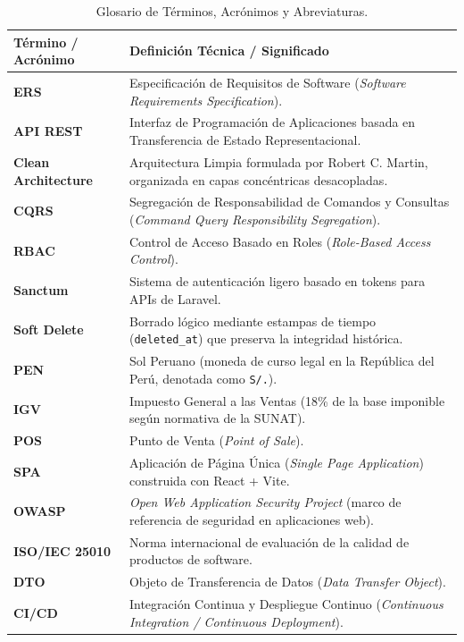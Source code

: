 \begin{table}[H]
\centering
\small
\begin{tabularx}{\linewidth}{l>{\raggedright\arraybackslash}X}
\toprule
\rowcolor{LightSlate}
\textbf{Término / Acrónimo} & \textbf{Definición Técnica / Significado} \\
\midrule
\textbf{ERS} & Especificación de Requisitos de Software (\textit{Software Requirements Specification}). \\
\textbf{API REST} & Interfaz de Programación de Aplicaciones basada en Transferencia de Estado Representacional. \\
\textbf{Clean Architecture} & Arquitectura Limpia formulada por Robert C. Martin, organizada en capas concéntricas desacopladas. \\
\textbf{CQRS} & Segregación de Responsabilidad de Comandos y Consultas (\textit{Command Query Responsibility Segregation}). \\
\textbf{RBAC} & Control de Acceso Basado en Roles (\textit{Role-Based Access Control}). \\
\textbf{Sanctum} & Sistema de autenticación ligero basado en tokens para APIs de Laravel. \\
\textbf{Soft Delete} & Borrado lógico mediante estampas de tiempo (\texttt{deleted\_at}) que preserva la integridad histórica. \\
\textbf{PEN} & Sol Peruano (moneda de curso legal en la República del Perú, denotada como \texttt{S/.}). \\
\textbf{IGV} & Impuesto General a las Ventas (18\% de la base imponible según normativa de la SUNAT). \\
\textbf{POS} & Punto de Venta (\textit{Point of Sale}). \\
\textbf{SPA} & Aplicación de Página Única (\textit{Single Page Application}) construida con React + Vite. \\
\textbf{OWASP} & \textit{Open Web Application Security Project} (marco de referencia de seguridad en aplicaciones web). \\
\textbf{ISO/IEC 25010} & Norma internacional de evaluación de la calidad de productos de software. \\
\textbf{DTO} & Objeto de Transferencia de Datos (\textit{Data Transfer Object}). \\
\textbf{CI/CD} & Integración Continua y Despliegue Continuo (\textit{Continuous Integration / Continuous Deployment}). \\
\bottomrule
\end{tabularx}
\caption{Glosario de Términos, Acrónimos y Abreviaturas.}
\label{tab:glosario}
\end{table}

